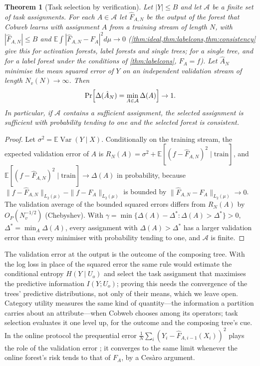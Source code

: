 \documentclass[11pt]{article}
\newtheorem{theorem}{Theorem}
\theoremstyle{definition}
\theoremstyle{remark}
\newcommand{\E}{\mathbb{E}}
\newcommand{\cA}{\mathcal{A}}
\newcommand{\Var}{\operatorname{Var}}
\begin{document}
\begin{theorem}[Task selection by verification]\label{thm:selection}
Let $|Y|\le B$ and let $\cA$ be a finite set of task assignments.  For each $A\in\cA$ let
$\hat F_{A,N}$ be
the output of the forest that Cobweb learns with assignment $A$ from a training stream
of length $N$, with $|\hat F_{A,N}|\le B$ and $\E\int|\hat F_{A,N}-F_A|^2d\mu\to0$
(\cref{thm:ideal,thm:labelcons,thm:consistency} give this for activation forests, label
forests and single trees; for a single tree, and for a label forest under the conditions
of \cref{thm:labelcons}, $F_A=f$).  Let $\hat A_N$ minimise the mean squared error of $Y$ on an
independent validation stream of length $N_v(N)\to\infty$.  Then
\[
  \Pr\Bigl[\Delta(\hat A_N)=\min_{A\in\cA}\Delta(A)\Bigr]\to1.
\]
In particular, if $\cA$ contains a sufficient assignment, the selected assignment is
sufficient with probability tending to one and the selected forest is consistent.
\end{theorem}
\begin{proof}
Let $\sigma^2=\E\Var(Y\mid X)$.  Conditionally on the training stream, the expected
validation error of $A$ is
$R_N(A)=\sigma^2+\E[(f-\hat F_{A,N})^2\mid\text{train}]$, and
$\E[(f-\hat F_{A,N})^2\mid\text{train}]\to\Delta(A)$ in probability, because
$\|f-\hat F_{A,N}\|_{L_2(\mu)}-\|f-F_A\|_{L_2(\mu)}$ is bounded by
$\|\hat F_{A,N}-F_A\|_{L_2(\mu)}\to0$.  The validation average of the bounded squared
errors differs from $R_N(A)$ by $O_P(N_v^{-1/2})$ (Chebyshev).  With
$\gamma=\min\{\Delta(A)-\Delta^*:\Delta(A)>\Delta^*\}>0$, $\Delta^*=\min_A\Delta(A)$,
every assignment with $\Delta(A)>\Delta^*$ has a larger validation error than every
minimiser with probability tending to one, and $\cA$ is finite.
\end{proof}

The validation error at the output is the outcome of the composing tree.  With the log
loss in place of the squared error the same rule would estimate the conditional entropy
$H(Y\mid U_o)$ and select the task assignment that maximises the predictive information
$I(Y;U_o)$; proving this needs the convergence of the trees' predictive distributions,
not only of their means, which we leave open.  Category utility measures the same kind of
quantity---the information a partition carries about an attribute---when Cobweb chooses
among its operators; task selection evaluates it one level up, for the outcome and the
composing tree's cue.  In
the online protocol the prequential error $\frac1N\sum_i(Y_i-\hat F_{A,i-1}(X_i))^2$
plays the role of the validation error \citep{dawid1984}; it converges to the same limit
whenever the online forest's risk tends to that of $F_A$, by a Ces\`aro argument.
\end{document}
